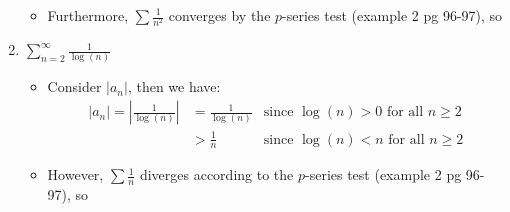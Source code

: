 \documentclass[10pt,a4paper]{article}
\theoremstyle{definition}
\begin{document}
\begin{enumerate}[label = (\alph*)]
\begin{itemize}
	\item Furthermore, $\displaystyle \sum \frac{1}{n^2}$ converges by the $p$-series test (example 2 pg 96-97), so \\
	\end{itemize}
\item $\displaystyle \sum_{n = 2}^{\infty} \frac{1}{\log(n)}$
	\begin{itemize}
	\item Consider $|a_n|$, then we have:
	\begin{align*}
	|a_n| = \left|\frac{1}{\log(n)}\right| &= \frac{1}{\log(n)} &\text{since $\log(n) > 0$ for all $n \geq 2$}\\
	&> \frac{1}{n} &\text{since $\log(n) < n$ for all $n \geq 2$}
	\end{align*}
	\item However, $\displaystyle \sum \frac{1}{n}$ diverges according to the $p$-series test (example 2 pg 96-97), so \\
	\end{itemize}
\end{enumerate}
\end{document}
